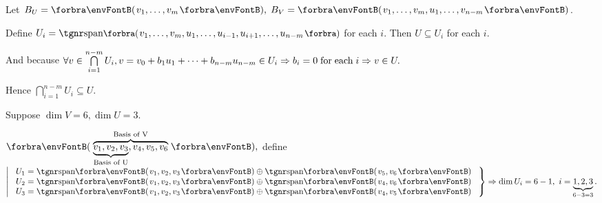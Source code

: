 \par\quad
Let $B_U=\Par{v_1,\dots,v_m},\;B_V=\Par{v_1,\dots,v_m,u_1,\dots,v_{n-m}}$.\par\quad
Define $U_i=\Span[\BigPar]{v_1,\dots,v_m,u_1,\dots,u_{i-1},u_{i+1},\dots,u_{n-m}}$ for each $i$. Then $U\subseteq U_i$ for each $i.$\vspace{4pt}\par\quad
And because $\forall v\in \bigcap\limits_{i=1}^{n-m}U_i,v=v_0+b_1 u_1+\dots+b_{n-m} u_{n-m}\in U_i\Rightarrow b_i=0 \text{\;for\;each\;} i\Rightarrow v\in U.$\vspace{-4pt}\par\quad
Hence $\bigcap\limits_{i=1}^{n-m}U_i\subseteq U.$\PfEnd\vspace{10pt}
\Example\,\,\, {Suppose $\dim V=6,\dim U=3$.\par\vspace{2pt}\quad
	$\Par{\overbrace{\underbrace{v_1,v_2,v_3}_\text{Basis of U},v_4,v_5,v_6}^\text{Basis of V}},$ define $\hMath[0pt]{l}{\left|}{\right\}}{$
		$U_1=\Span{v_1,v_2,v_3}\oplus\Span{v_5,v_6}\\ $
		$U_2=\Span{v_1,v_2,v_3}\oplus\Span{v_4,v_6}\\ $
		$U_3=\Span{v_1,v_2,v_3}\oplus\Span{v_4,v_5}$
		$}\Rightarrow\dim U_i=6-1,\,\,i=\underbrace{1,2,3}_{6-3=3}.$}
\PfEnd[-10pt]\vspace{-4pt}
\SepLine

